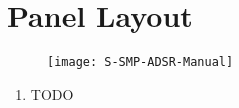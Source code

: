 \documentclass[12pt,letter]{article}
\begin{document}

\clearpage
\section{Panel Layout}

\begin{figure}[!htp]
\centering
\texttt{[image: S-SMP-ADSR-Manual]}
\end{figure}

\clearpage
\begin{enumerate}
  \item TODO
\end{enumerate}


\clearpage
\renewcommand\refname{References \& Acknowledgments}
\nocite{*}


\end{document}
